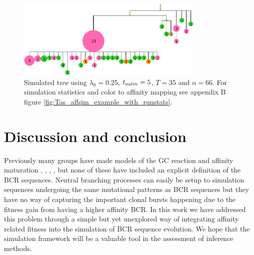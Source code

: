 \begin{figure}
    \centering
    \includegraphics[width=0.8\textwidth]{figures/Tas_affsim_example_collapsed_runstat_color_tree.pdf}
    \caption{
        \label{fig:Tas_affsim_example.collapsed_runstat_color_tree}
        Simulated tree using $\lambda_0=0.25$, $t_{\text{naive}}=5$, $T=35$ and $n=66$.
        For simulation statistics and color to affinity mapping see appendix B figure \ref{fig:Tas_affsim_example_with_runstats}.
    }
\end{figure}





\section{Discussion and conclusion}
Previously many groups have made models of the GC reaction and affinity maturation \cite{Reshetova_2017}, \cite{Shahaf_2008}, \cite{Chaudhury_2014}, \cite{Wang_Mata_2015}, but none of these have included an explicit definition of the BCR sequences.
Neutral branching processes can easily be setup to simulation sequences undergoing the same mutational patterns as BCR sequences but they have no way of capturing the important clonal bursts happening due to the fitness gain from having a higher affinity BCR.
In this work we have addressed this problem through a simple but yet unexplored way of integrating affinity related fitness into the simulation of BCR sequence evolution.
We hope that the simulation framework will be a valuable tool in the assessment of inference methods.

